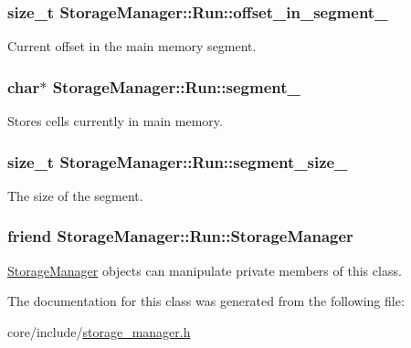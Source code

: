 \subsubsection[{offset\+\_\+in\+\_\+segment\+\_\+}]{\setlength{\rightskip}{0pt plus 5cm}size\+\_\+t Storage\+Manager\+::\+Run\+::offset\+\_\+in\+\_\+segment\+\_\+\hspace{0.3cm}{\ttfamily [private]}}\label{classStorageManager_1_1Run_ac53033fb4e873a77608550a8787c06a8}
Current offset in the main memory segment. \hypertarget{classStorageManager_1_1Run_a3968c31effbd9d638615c7e04579faf3}{}
\subsubsection[{segment\+\_\+}]{\setlength{\rightskip}{0pt plus 5cm}char$\ast$ Storage\+Manager\+::\+Run\+::segment\+\_\+\hspace{0.3cm}{\ttfamily [private]}}\label{classStorageManager_1_1Run_a3968c31effbd9d638615c7e04579faf3}
Stores cells currently in main memory. \hypertarget{classStorageManager_1_1Run_adfedc4915b956cfdb35e3a2db5e263ed}{}
\subsubsection[{segment\+\_\+size\+\_\+}]{\setlength{\rightskip}{0pt plus 5cm}size\+\_\+t Storage\+Manager\+::\+Run\+::segment\+\_\+size\+\_\+\hspace{0.3cm}{\ttfamily [private]}}\label{classStorageManager_1_1Run_adfedc4915b956cfdb35e3a2db5e263ed}
The size of the segment. \hypertarget{classStorageManager_1_1Run_a3512c9f27a76e8f052fa0d98d8f9ff95}{}
\subsubsection[{Storage\+Manager}]{\setlength{\rightskip}{0pt plus 5cm}friend Storage\+Manager\+::\+Run\+::\+Storage\+Manager\hspace{0.3cm}{\ttfamily [private]}}\label{classStorageManager_1_1Run_a3512c9f27a76e8f052fa0d98d8f9ff95}
\hyperlink{classStorageManager}{Storage\+Manager} objects can manipulate private members of this class. 

The documentation for this class was generated from the following file\+:\begin{DoxyCompactItemize}
\item 
core/include/\hyperlink{storage__manager_8h}{storage\+\_\+manager.\+h}\end{DoxyCompactItemize}
